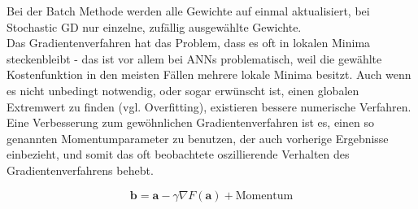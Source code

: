 Bei der Batch Methode werden alle Gewichte auf einmal aktualisiert, bei Stochastic GD nur einzelne, zufällig ausgewählte Gewichte.\\

Das Gradientenverfahren hat das Problem, dass es oft in lokalen Minima steckenbleibt - das ist vor allem bei ANNs problematisch, weil die gewählte Kostenfunktion in den meisten Fällen mehrere lokale Minima besitzt. Auch wenn es nicht unbedingt notwendig, oder sogar erwünscht ist, einen globalen Extremwert zu finden (vgl. Overfitting), existieren bessere numerische Verfahren. \\

Eine Verbesserung zum gewöhnlichen Gradientenverfahren ist es, einen so genannten Momentumparameter zu benutzen, der auch vorherige Ergebnisse einbezieht, und somit das oft beobachtete oszillierende Verhalten des Gradientenverfahrens behebt.

\begin{equation}
 \mathbf{b} = \mathbf{a}-\gamma\nabla F(\mathbf{a}) + \text{Momentum}
\end{equation}